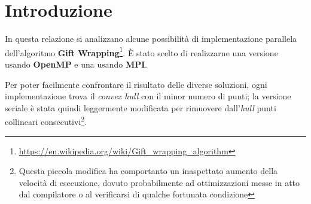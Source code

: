 \section{Introduzione}
In questa relazione si analizzano alcune possibilità di implementazione parallela dell'algoritmo \textbf{Gift Wrapping}\footnote{\url{https://en.wikipedia.org/wiki/Gift_wrapping_algorithm}}.
È stato scelto di realizzarne una versione usando \textbf{OpenMP} e una usando \textbf{MPI}.

Per poter facilmente confrontare il risultato delle diverse soluzioni, ogni implementazione trova il \emph{convex hull} con il minor numero di punti;
la versione seriale è stata quindi leggermente modificata per rimuovere dall'\emph{hull} punti collineari consecutivi\footnote{Questa piccola modifica ha comportanto un inaspettato aumento della velocità di esecuzione, dovuto probabilmente ad ottimizzazioni messe in atto dal compilatore o al verificarsi di qualche fortunata condizione}.
 
